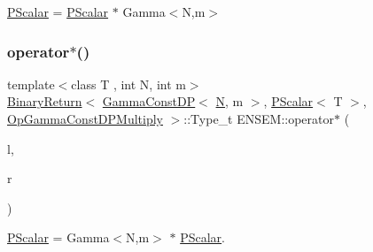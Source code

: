 \mbox{\hyperlink{classENSEM_1_1PScalar}{P\+Scalar}} = \mbox{\hyperlink{classENSEM_1_1PScalar}{P\+Scalar}} $\ast$ Gamma$<$\+N,m$>$ 

\mbox{\label{group__primscalar_gab3054a5c0ba0653b3b4069e2449e20ab}} 
\subsubsection{\texorpdfstring{operator$\ast$()}{operator*()}\hspace{0.1cm}{\footnotesize\ttfamily [4/5]}}
{\footnotesize\ttfamily template$<$class T , int N, int m$>$ \\
\mbox{\hyperlink{structENSEM_1_1BinaryReturn}{Binary\+Return}}$<$ \mbox{\hyperlink{classENSEM_1_1GammaConstDP}{Gamma\+Const\+DP}}$<$ \mbox{\hyperlink{operator__name__util_8cc_a7722c8ecbb62d99aee7ce68b1752f337}{N}}, m $>$, \mbox{\hyperlink{classENSEM_1_1PScalar}{P\+Scalar}}$<$ T $>$, \mbox{\hyperlink{structENSEM_1_1OpGammaConstDPMultiply}{Op\+Gamma\+Const\+D\+P\+Multiply}} $>$\+::Type\+\_\+t E\+N\+S\+E\+M\+::operator$\ast$ (\begin{DoxyParamCaption}\item[{const \mbox{\hyperlink{classENSEM_1_1GammaConstDP}{Gamma\+Const\+DP}}$<$ \mbox{\hyperlink{operator__name__util_8cc_a7722c8ecbb62d99aee7ce68b1752f337}{N}}, m $>$ \&}]{l,  }\item[{const \mbox{\hyperlink{classENSEM_1_1PScalar}{P\+Scalar}}$<$ T $>$ \&}]{r }\end{DoxyParamCaption})\hspace{0.3cm}{\ttfamily [inline]}}



\mbox{\hyperlink{classENSEM_1_1PScalar}{P\+Scalar}} = Gamma$<$\+N,m$>$ $\ast$ \mbox{\hyperlink{classENSEM_1_1PScalar}{P\+Scalar}}. 

\mbox{\label{group__primscalar_ga97e70139990daa175326a04636431dbd}} 
